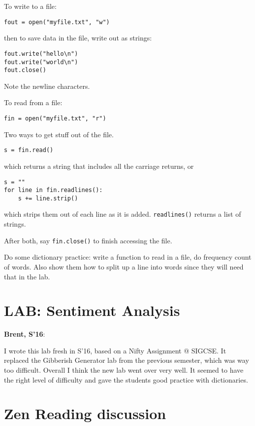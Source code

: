 \documentclass{article}
\newenvironment{reflect}[1]
{
  \noindent
  \begin{lrbox}{\reflectbox}
    \begin{minipage}[t]{\textwidth}
      \textbf{#1}:
}{
    \end{minipage}
  \end{lrbox}
  \fbox{\usebox{\reflectbox}}
}
\begin{document}
To write to a file:

\begin{verbatim}
fout = open("myfile.txt", "w")
\end{verbatim}

then to save data in the file, write out as strings:

\begin{verbatim}
fout.write("hello\n")
fout.write("world\n")
fout.close()
\end{verbatim}
Note the newline characters.

To read from a file:

\begin{verbatim}
fin = open("myfile.txt", "r")
\end{verbatim}

Two ways to get stuff out of the file.

\begin{verbatim}
s = fin.read()
\end{verbatim}

which returns a string that includes all the carriage returns, or

\begin{verbatim}
s = ""
for line in fin.readlines():
    s += line.strip()
\end{verbatim}

which strips them out of each line as it is added. \verb|readlines()|
returns a list of strings.

After both, say \verb|fin.close()| to finish accessing the file.

Do some dictionary practice: write a function to read in a file, do
frequency count of words.  Also show them how to split up a line into
words since they will need that in the lab.

\section*{LAB: Sentiment Analysis}

\begin{reflect}{Brent, S'16}
  I wrote this lab fresh in S'16, based on a Nifty Assignment @
  SIGCSE.  It replaced the Gibberish Generator lab from the previous
  semester, which was way too difficult.  Overall I think the new lab
  went over very well.  It seemed to have the right level of
  difficulty and gave the students good practice with dictionaries.
\end{reflect}

\section{Zen Reading discussion}
\end{document}
